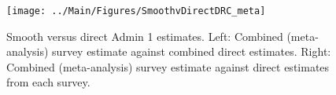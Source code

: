 \documentclass[12pt]{article}\usepackage[]{graphicx}\usepackage[]{color}
\newenvironment{knitrout}{}{} %
\begin{document}



\begin{knitrout}
\color{fgcolor}\begin{figure}[bht]

{\centering \texttt{[image: ../Main/Figures/SmoothvDirectDRC\_meta]} 

}

\caption[Smooth versus direct Admin 1 estimates]{Smooth versus direct Admin 1 estimates. Left: Combined (meta-analysis) survey estimate against combined direct estimates. Right: Combined (meta-analysis) survey estimate against direct estimates from each survey.}\label{fig:unnamed-chunk-93}
\end{figure}


\end{knitrout}
\end{document}
